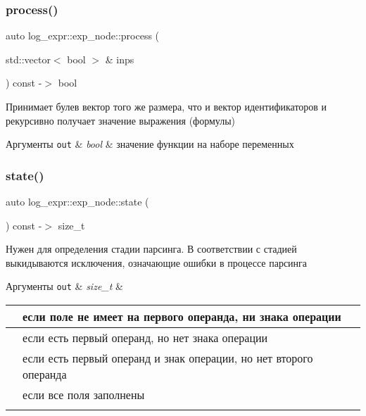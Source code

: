 \subsubsection{\texorpdfstring{process()}{process()}}
{\footnotesize\ttfamily auto log\+\_\+expr\+::exp\+\_\+node\+::process (\begin{DoxyParamCaption}\item[{std\+::vector$<$ bool $>$ \&}]{inps }\end{DoxyParamCaption}) const -\/$>$ bool}

Принимает булев вектор того же размера, что и вектор идентификаторов и рекурсивно получает значение выражения (формулы) 
\begin{DoxyParams}[1]{Аргументы}
\mbox{\tt out}  & {\em bool} & значение функции на наборе переменных \\
\hline
\end{DoxyParams}
\mbox{\label{structlog__expr_1_1exp__node_abf9c12a0b095cdc55091d13ae541e03e}} 
\subsubsection{\texorpdfstring{state()}{state()}}
{\footnotesize\ttfamily auto log\+\_\+expr\+::exp\+\_\+node\+::state (\begin{DoxyParamCaption}{ }\end{DoxyParamCaption}) const -\/$>$ size\+\_\+t}

Нужен для определения стадии парсинга. В соответствии с стадией выкидываются исключения, означающие ошибки в процессе парсинга 
\begin{DoxyParams}[1]{Аргументы}
\mbox{\tt out}  & {\em size\+\_\+t} & \hypertarget{class_quine___mc_cluskey___simplifier_multi_row}{}
\begin{tabularx}{\linewidth}{|*{2}{>{\raggedright\arraybackslash}X|}}\caption{Возвращаемые значения}\label{class_quine___mc_cluskey___simplifier_multi_row}\\
\hline
\PBS\centering 0&\PBS\centering если поле не имеет на первого операнда, ни знака операции \\\cline{1-2}
\PBS\centering 1&\PBS\centering если есть первый операнд, но нет знака операции \\\cline{1-2}
\PBS\centering 2&\PBS\centering если есть первый операнд и знак операции, но нет второго операнда \\\cline{1-2}
\PBS\centering 3&\PBS\centering если все поля заполнены \\\cline{1-2}
\end{tabularx}
~\newline
\\
\hline
\end{DoxyParams}


